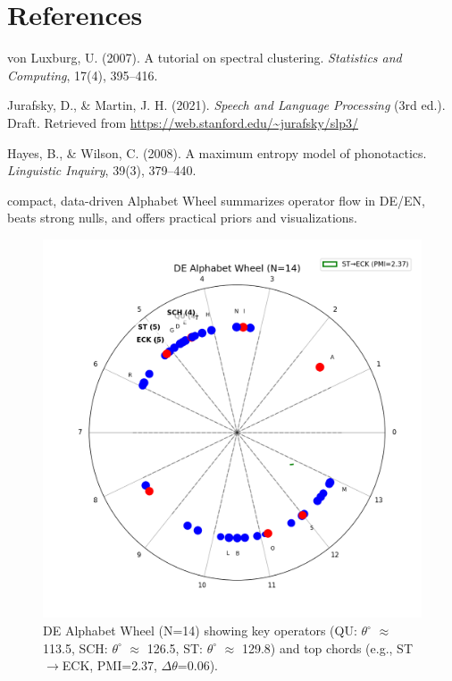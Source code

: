 \documentclass[10pt]{article}
\begin{document}
\section*{References}
\begingroup
\renewcommand{\section}[2]{} %
\begin{thebibliography}{10}

von Luxburg, U. (2007).
\newblock A tutorial on spectral clustering.
\newblock \textit{Statistics and Computing}, 17(4), 395–416.

Jurafsky, D., \& Martin, J. H. (2021).
\newblock \textit{Speech and Language Processing} (3rd ed.).
\newblock Draft. Retrieved from \url{https://web.stanford.edu/~jurafsky/slp3/}

Hayes, B., \& Wilson, C. (2008).
\newblock A maximum entropy model of phonotactics.
\newblock \textit{Linguistic Inquiry}, 39(3), 379–440.

\end{thebibliography}
\endgroup

\section{Conclusion}
A compact, data-driven Alphabet Wheel summarizes operator flow in DE/EN, beats strong nulls, and offers practical priors and visualizations.

\begin{figure}[htbp]
    \centering
    \includegraphics[width=0.8\linewidth]{de_wheel.png} %
    \caption{DE Alphabet Wheel (N=14) showing key operators (QU: $\theta^\circ$ $\approx$ 113.5, SCH: $\theta^\circ$ $\approx$ 126.5, ST: $\theta^\circ$ $\approx$ 129.8) and top chords (e.g., ST$\to$ECK, PMI=2.37, $\Delta\theta$=0.06).}
    \label{fig:de-wheel}
\end{figure}
\end{document}
